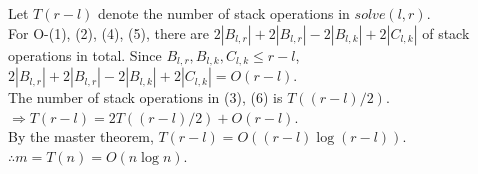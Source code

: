 \begin{pr}
Let $T(r-l)$ denote the number of stack operations in $solve(l, r)$.\\
For O-(1), (2), (4), (5), there are $2|B_{l, r}|+2|B_{l, r}|-2|B_{l, k}|+2|C_{l, k}|$ of stack operations in total. Since $B_{l, r}, B_{l, k}, C_{l, k}\leq r-l$, $2|B_{l, r}|+2|B_{l, r}|-2|B_{l, k}|+2|C_{l, k}|=O(r-l)$.\\
The number of stack operations in (3), (6) is $T((r-l)/2)$.\\
$\Rightarrow T(r-l)=2T((r-l)/2)+O(r-l)$.\\
By the master theorem, $T(r-l)=O((r-l)\log(r-l))$.\\
$\therefore m=T(n)=O(n\log n)$.
\end{pr}
